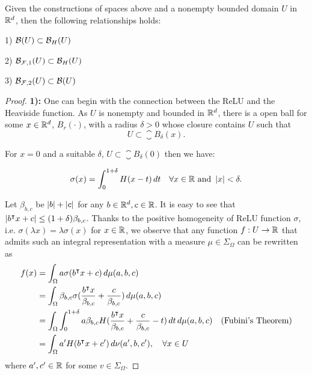 \begin{lemma}
    Given the constructions of spaces above and a nonempty bounded domain $U$ in
    $\mathbb{R}^d$, then the following relationships holds:

    1) $\mathcal{B}(U) \subset \mathcal{B}_{H}(U)$

    2) $\mathcal{B}_{\mathcal{F}, 1}(U) \subset \mathcal{B}_{H}(U)$

    3) $\mathcal{B}_{\mathcal{F}, 2}(U) \subset \mathcal{B}(U)$
\end{lemma}


\begin{proof}


\textbf{1):} 
One can begin with the connection between the ReLU and the Heaviside function.
As $U$ is nonempty and bounded in $\mathbb{R}^d$, there is a open ball for some $x \in
\mathbb{R}^d$, $B_r(\cdot)$, with a radius $\delta > 0$ whose closure contains $U$ such
that
\begin{equation}
    U \subset \closure{B_{\delta}(x)}.
\end{equation}

For $x=0$ and a suitable $\delta$, $U \subset \closure{B_{\delta}(0)}$ then we
have:

\begin{equation}
    \sigma(x) = \int_0^{1+\delta} H(x-t) \,dt 
    \quad \forall x \in \mathbb{R} \textnormal{ and } \left| x \right| < \delta.
\end{equation}

Let $\beta_{b,c}$ be $\left| b \right| + \left| c \right|$ for any $b\in\mathbb{R}^d, c\in\mathbb{R}$. It is easy
to see that $\left| b{}^{\intercal} x + c \right| \leq (1+\delta)\beta_{b,c}$. Thanks to the
positive homogeneity of ReLU function $\sigma$, i.e. $\sigma(\lambda x) =
\lambda \sigma(x)$ for $x \in \mathbb{R}$, we observe that any function $f:U\to\mathbb{R}$ that
admits such an integral representation with a measure $\mu \in \Sigma_{\Omega}$
can be rewritten as
\begin{align*}
    f(x) 
    &= \int_{\Omega} a \sigma(b{}^{\intercal} x + c )\,d\mu(a,b,c) \\
    &= \int_{\Omega} \beta_{b,c} \sigma(
        \frac{b{}^{\intercal} x}{\beta_{b,c}}+ \frac{c}{\beta_{b,c}}
    ) \,d\mu(a,b,c) \\
    &= \int_{\Omega} \int_0^{1+\delta} 
        a\beta_{b,c} H(\frac{b{}^{\intercal} x}{\beta_{b,c}} +
        \frac{c}{\beta_{b,c}} -t)\,dt\,d\mu(a,b,c) \quad
        \text{(Fubini's Theorem)} \\
    &= \int_{\Omega} a' H(b{}^{\intercal} x + c') \,d\nu(a',b,c'), 
    \quad \forall x \in U
\end{align*}
where $a', c' \in \mathbb{R}$ for some $v \in \Sigma_{\Omega}$.


\end{proof}
